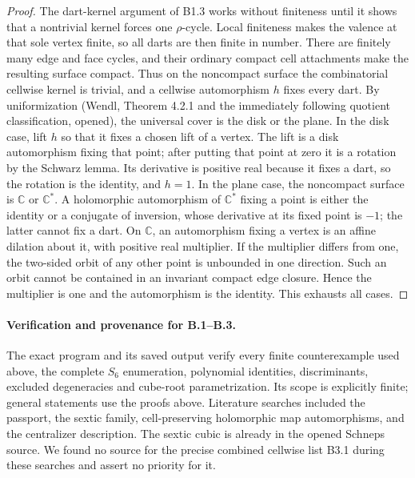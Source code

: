 \begin{proof}
The dart-kernel argument of B1.3 works without finiteness until it
shows that a nontrivial kernel forces one $\rho$-cycle. Local
finiteness makes the valence at that sole vertex finite, so all
darts are then finite in number. There are finitely many edge and
face cycles, and their ordinary compact cell attachments make
the resulting surface compact. Thus on the noncompact surface
the combinatorial cellwise kernel is trivial, and a cellwise
automorphism $h$ fixes every dart.
By uniformization (Wendl, Theorem 4.2.1 and the immediately following
quotient classification, opened), the universal cover is the disk
or the plane. In the disk case, lift $h$ so that it fixes a chosen
lift of a vertex. The lift is a disk automorphism fixing that point;
after putting that point at zero it is a rotation by the Schwarz
lemma. Its derivative is positive real because it fixes a dart,
so the rotation is the identity, and $h=1$.
In the plane case, the noncompact surface is $\mathbb C$ or
$\mathbb C^*$. A holomorphic automorphism of $\mathbb C^*$ fixing
a point is either the identity or a conjugate of inversion, whose
derivative at its fixed point is $-1$; the latter cannot fix a dart.
On $\mathbb C$, an automorphism fixing a vertex is an affine
dilation about it, with positive real multiplier. If the multiplier
differs from one, the two-sided orbit of any other point is
unbounded in one direction. Such an orbit cannot be contained in
an invariant compact edge closure. Hence the multiplier is one
and the automorphism is the identity. This exhausts all cases.
\end{proof}

\paragraph{Verification and provenance for B.1--B.3.}
The exact program  and its
saved output verify every finite counterexample used above, the
complete $S_6$ enumeration, polynomial identities, discriminants,
excluded degeneracies and cube-root parametrization. Its scope
is explicitly finite; general statements use the proofs above.
Literature searches included the passport, the sextic family,
cell-preserving holomorphic map automorphisms, and the centralizer
description. The sextic cubic is already in the opened Schneps
source. We found no source for the precise combined cellwise list
B3.1 during these searches and assert no priority for it.
